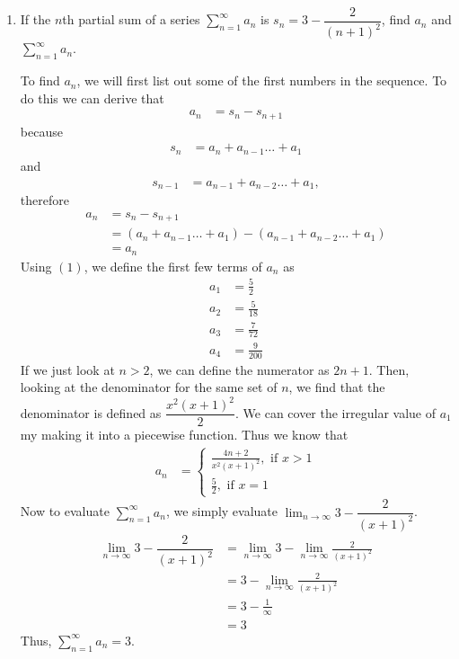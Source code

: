 \documentclass{article}
\begin{document}
\begin{enumerate}[label=\textbf{(10.\arabic*)}]

\item If the $n$th partial sum of a series $\displaystyle \sum_{n=1}^\infty a_n$ is $s_n=3-\dfrac{2}{(n+1)^2}$, find $a_n$ and $\displaystyle \sum_{n=1}^\infty a_n$.

To find $a_n$, we will first list out some of the first numbers in the sequence. To do this we can derive that \begin{align}
a_n &= s_n-s_{n+1}
\end{align}
because
\begin{align*}
s_n &= a_n+a_{n-1} \ldots +a_1
\end{align*}
and 
\begin{align*}
s_{n-1} &= a_{n-1}+a_{n-2}\ldots+a_{1},
\end{align*}
therefore
\begin{align*}
a_n &= s_n-s_{n+1}\\
&= (a_n+a_{n-1} \ldots +a_1) - (a_{n-1}+a_{n-2}\ldots+a_{1})\\
&= a_n
\end{align*}
Using $(1)$, we define the first few terms of $a_n$ as
\begin{align*}
a_1 &= \frac{5}{2}\\
a_2 &= \frac{5}{18}\\
a_3 &= \frac{7}{72}\\
a_4 &= \frac{9}{200}
\end{align*}
If we just look at $n>2$, we can define the numerator as $2n+1$. Then, looking at the denominator for the same set of $n$, we find that the denominator is defined as $\dfrac{x^2(x+1)^2}{2}$. We can cover the irregular value of $a_1$ my making it into a piecewise function. Thus we know that
\begin{align*}
a_n &= \begin{cases}
\frac{4n+2}{x^2(x+1)^2}, \text{ if } x > 1\\
\frac{5}{2}, \text{ if } x = 1
\end{cases}
\end{align*}
Now to evaluate $\displaystyle \sum_{n=1}^\infty a_n$, we simply evaluate $\lim_{n\to\infty} 3-\dfrac{2}{(x+1)^2}$.
\begin{align*}
\lim_{n\to\infty} 3-\dfrac{2}{(x+1)^2} &= \lim_{n\to\infty} 3-\lim_{n\to\infty} \frac{2}{(x+1)^2}\\
&= 3-\lim_{n\to\infty} \frac{2}{(x+1)^2}\\
&= 3-\frac{1}{\infty}\\
&= 3
\end{align*}
Thus, $\displaystyle \sum_{n=1}^\infty a_n=3$.


\end{enumerate}
\end{document}
